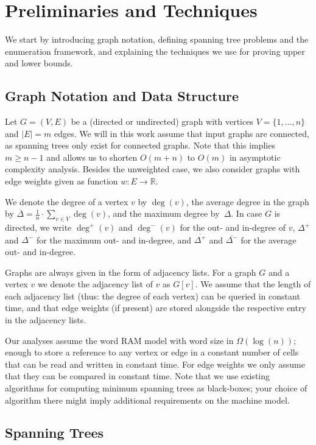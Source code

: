 \documentclass[a4paper, USenglish, cleveref, autoref, thm-restate]{lipics-v2021}
\newcommand{\maxdeg}{\Delta}
\newcommand{\maxoutdeg}{\Delta^+}
\newcommand{\maxindeg}{\Delta^-}
\newcommand{\avgdeg}{\overline{\Delta}}
\newcommand{\avgoutdeg}{\overline{\Delta^+}}
\newcommand{\avgindeg}{\overline{\Delta^-}}
\newcommand{\outdeg}{\deg^+}
\newcommand{\indeg}{\deg^-}
\begin{document}
\section{Preliminaries and Techniques}
\label{sec:preliminaries}

We start by introducing graph notation, defining spanning tree problems and the enumeration framework, and explaining the techniques we use for proving upper and lower bounds.

\subsection{Graph Notation and Data Structure}
\label{subsec:notation}

Let $G = (V, E)$ be a (directed or undirected) graph with vertices $V = \{1, \ldots, n\}$ and $|E| = m$ edges.
We will in this work assume that input graphs are connected, as spanning trees only exist for connected graphs.
Note that this implies $m \geq n-1$ and allows us to shorten $O(m+n)$ to $O(m)$ in asymptotic complexity analysis.
Besides the unweighted case, we also consider graphs with edge weights given as function $w\colon E \to \mathbb{R}$.

We denote the degree of a vertex $v$ by $\deg(v)$, the average degree in the graph by $\avgdeg = \frac{1}{n} \cdot \sum_{v\in V} \deg(v)$, and the maximum degree by~$\maxdeg$.
In case $G$ is directed, we write $\outdeg(v)$ and $\indeg(v)$ for the out- and in-degree of $v$, $\maxoutdeg$ and $\maxindeg$ for the maximum out- and in-degree, and $\avgoutdeg$ and $\avgindeg$ for the average out- and in-degree.

Graphs are always given in the form of adjacency lists.
For a graph $G$ and a vertex $v$ we denote the adjacency list of $v$ as $G[v]$.
We assume that the length of each adjacency list (thus: the degree of each vertex) can be queried in constant time, and that edge weights (if present) are stored alongside the respective entry in the adjacency lists.

Our analyses assume the word RAM model with word size in $\Omega(\log(n))$; enough to store a reference to any vertex or edge in a constant number of cells that can be read and written in constant time.
For edge weights we only assume that they can be compared in constant time.
Note that we use existing algorithms for computing minimum spanning trees as black-boxes; your choice of algorithm there might imply additional requirements on the machine model.

\subsection{Spanning Trees}
\end{document}
